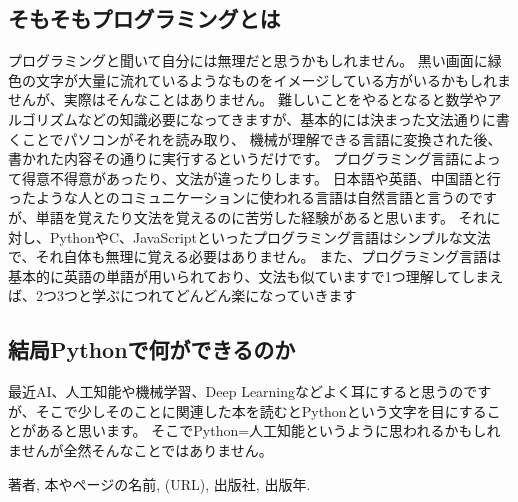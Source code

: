\documentclass[10pt,b5paper,papersize,dvipdfmx]{jsbook}
\begin{document}
\subsection{そもそもプログラミングとは}
プログラミングと聞いて自分には無理だと思うかもしれません。
黒い画面に緑色の文字が大量に流れているようなものをイメージしている方がいるかもしれませんが、実際はそんなことはありません。
難しいことをやるとなると数学やアルゴリズムなどの知識必要になってきますが、基本的には決まった文法通りに書くことでパソコンがそれを読み取り、
機械が理解できる言語に変換された後、書かれた内容その通りに実行するというだけです。
プログラミング言語によって得意不得意があったり、文法が違ったりします。
日本語や英語、中国語と行ったような人とのコミュニケーションに使われる言語は自然言語と言うのですが、単語を覚えたり文法を覚えるのに苦労した経験があると思います。
それに対し、PythonやC、JavaScriptといったプログラミング言語はシンプルな文法で、それ自体も無理に覚える必要はありません。
また、プログラミング言語は基本的に英語の単語が用いられており、文法も似ていますで1つ理解してしまえば、2つ3つと学ぶにつれてどんどん楽になっていきます\par
\subsection{結局Pythonで何ができるのか}
最近AI、人工知能や機械学習、Deep Learningなどよく耳にすると思うのですが、そこで少しそのことに関連した本を読むとPythonという文字を目にすることがあると思います。
そこでPython=人工知能というように思われるかもしれませんが全然そんなことではありません。

\begin{thebibliography}{99}
  \item 著者, 本やページの名前, (URL), 出版社, 出版年.
\end{thebibliography}
\end{document}
